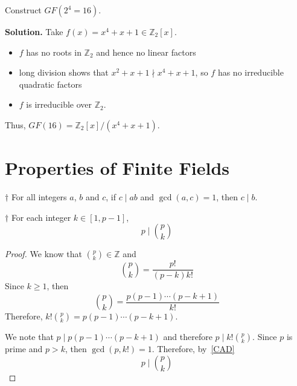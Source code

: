 
\begin{exbox}
    \begin{example}
        Construct $ GF(2^4=16) $.

        \textbf{Solution.} Take $ f(x)=x^4+x+1\in\mathbb{Z}_2[x] $.
        \begin{itemize}
            \item $ f $ has no roots in $ \mathbb{Z}_2 $ and hence no linear factors
            \item long division shows that $ x^2+x+1\nmid x^4+x+1 $, so $ f $
                  has no irreducible quadratic factors
            \item $ f $ is irreducible over $ \mathbb{Z}_2 $.
        \end{itemize}
        Thus, $ GF(16)=\mathbb{Z}_2[x]/(x^4+x+1) $.
    \end{example}
\end{exbox}

\section{Properties of Finite Fields}

\begin{thmbox}
    \begin{prop}\label{CAD}
        $ \dagger $ For all integers $ a $, $ b $ and $ c $, if $ c\mid ab $
        and $ \gcd(a,c)=1 $, then $ c\mid b $.
    \end{prop}
\end{thmbox}

\begin{thmbox}
    \begin{lemma}\label{p divides p choose k}
        $ \dagger $ For each integer $ k\in[1,p-1] $,
        \[ p\mid \binom{p}{k} \]
    \end{lemma}
\end{thmbox}

\begin{proof}
    We know that $ \binom{p}{k}\in\mathbb{Z} $ and
    \[ \binom{p}{k}=\frac{p!}{(p-k)k!} \]
    Since $ k\geqslant 1 $, then
    \[ \binom{p}{k}=\frac{p(p-1)\cdots(p-k+1)}{k!} \]
    Therefore, $ k!\binom{p}{k}=p(p-1)\cdots(p-k+1) $.

    We note that $ p\mid p(p-1)\cdots(p-k+1) $ and therefore
    $ p\mid k!\binom{p}{k} $. Since $ p $ is prime and $ p>k $,
    then $ \gcd(p,k!)=1 $. Therefore, by~\ref{CAD}
    \[ p\mid \binom{p}{k} \]
\end{proof}

